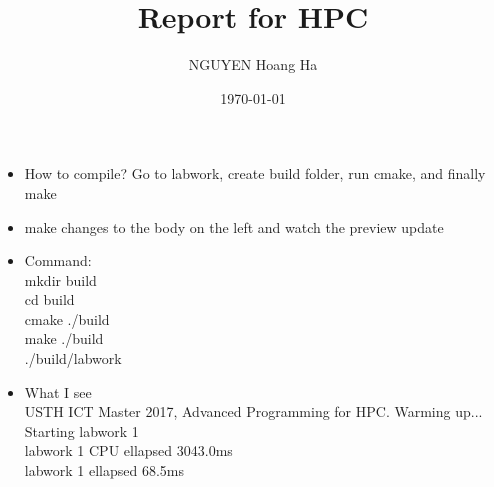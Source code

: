 \documentclass[12pt]{article}
\title{Report for HPC}
\author{NGUYEN Hoang Ha}
\date{\today}
\begin{document}
\maketitle


\begin{itemize}
  \item How to compile? Go to labwork, create build folder, run cmake, and finally make
  \item make changes to the body on the left and watch the preview update
  \item Command:\\ 
          mkdir build\\
          cd build\\
          cmake ./build\\
          make ./build\\
          ./build/labwork\\
  
  \item What I see\\
        USTH ICT Master 2017, Advanced Programming for HPC.
Warming up...\\
Starting labwork 1\\
labwork 1 CPU ellapsed 3043.0ms\\
labwork 1 ellapsed 68.5ms\\
\end{itemize}
\end{document}
